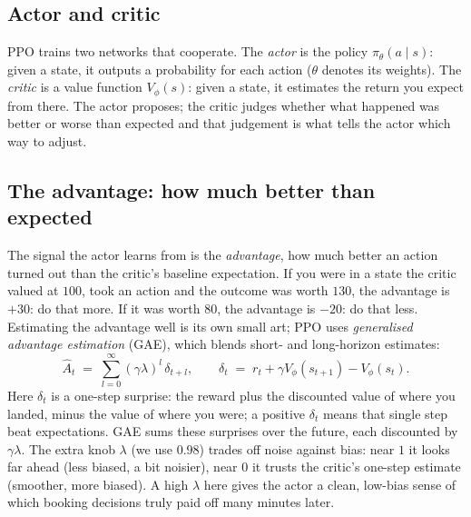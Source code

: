 \documentclass[11pt]{article}
\newcommand{\key}[1]{\textit{#1}}            %
\begin{document}
\subsection{Actor and critic}

PPO trains two networks that cooperate. The \key{actor} is the policy $\pi_\theta(a\mid s)$:
given a state, it outputs a probability for each action ($\theta$ denotes its weights). The
\key{critic} is a value function $V_\phi(s)$: given a state, it estimates the return you
expect from there. The actor proposes; the critic judges whether what happened was better
or worse than expected and that judgement is what tells the actor which way to adjust.

\subsection{The advantage: how much better than expected}

The signal the actor learns from is the \key{advantage}, how much better an action turned
out than the critic's baseline expectation. If you were in a state the critic valued at
$100$, took an action and the outcome was worth $130$, the advantage is $+30$: do that
more. If it was worth $80$, the advantage is $-20$: do that less. Estimating the advantage
well is its own small art; PPO uses \key{generalised advantage estimation} (GAE), which
blends short- and long-horizon estimates:
\begin{equation}
\hat A_t \;=\; \sum_{l=0}^{\infty} (\gamma\lambda)^{l}\,\delta_{t+l},
\qquad
\delta_t \;=\; r_t + \gamma V_\phi(s_{t+1}) - V_\phi(s_t).
\label{eq:gae}
\end{equation}
Here $\delta_t$ is a one-step surprise: the reward plus the discounted value of where you
landed, minus the value of where you were; a positive $\delta_t$ means that single step
beat expectations. GAE sums these surprises over the future, each discounted by
$\gamma\lambda$. The extra knob $\lambda$ (we use $0.98$) trades off noise against bias: near
$1$ it looks far ahead (less biased, a bit noisier), near $0$ it trusts the critic's
one-step estimate (smoother, more biased). A high $\lambda$ here gives the actor a clean,
low-bias sense of which booking decisions truly paid off many minutes later.
\end{document}
